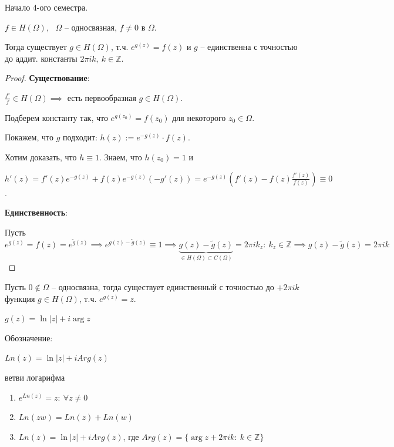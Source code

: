 Начало 4-ого семестра.

\begin{theorem}
    $f \in H(\Omega)$, \ $\Omega$ -- односвязная, $f \not = 0$ в $\Omega$.

    Тогда существует $g \in H(\Omega)$, т.ч. $e^{g(z)} = f(z)$ и $g$ -- единственна с точностью до аддит. константы $2 \pi i k, \ k \in \mathbb{Z}$.
\end{theorem}

\begin{proof}
    \textbf{Существование}:

    $\frac{f'}{f} \in H(\Omega) \implies $ есть первообразная $g \in H(\Omega)$. 
    
    Подберем константу так, что $e^{g(z_0)} =  f(z_0)$ для некоторого $z_0 \in \Omega$. 

    Покажем, что $g$ подходит: $h(z) := e^{-g(z)} \cdot f(z)$.

    Хотим доказать, что $h \equiv 1$. Знаем, что $h(z_0) = 1$ и
    
    $h'(z) = f'(z) e^{-g(z)} + f(z) e^{-g(z)} (-g'(z)) = e^{-g(z)} \left( f'(z) - f(z) \frac{f'(z)}{f(z)} \right) \equiv 0$.

    \textbf{Единственность}:

    Пусть $e^{g(z)} = f(z) = e^{\tilde{g}(z)} \implies e^{g(z) - \tilde{g}(z)} \equiv 1 \implies \underbrace{g(z) - \tilde{g}(z)}_{\in H(\Omega) \subset C(\Omega)} = 2 \pi i k_{z}: \ k_{z} \in \mathbb{Z} \implies g(z) - \tilde{g}(z) = 2 \pi i k$
\end{proof}

\begin{consequence}
    Пусть $0 \not \in \Omega$ -- односвязна, тогда существует единственный с точностью до $+ 2 \pi i k$ функция $g \in H(\Omega)$, т.ч. $e^{g(z)} = z$.
\end{consequence}

\begin{remark}
    $g(z) = \ln{|z|} + i \arg{z}$
\end{remark}

\begin{remark}
    Обозначение:

    $Ln(z) = \ln{|z|} + i Arg(z)$


    ветви логарифма
\end{remark}


\begin{properties}
    \begin{enumerate}
        \item $e^{Ln(z)} = z: \ \forall z \not = 0$
        \item $Ln(z w) = Ln(z) + Ln(w)$
        \item $Ln(z) = \ln{|z|} + i Arg(z)$, где $Arg(z) = \{ \arg{z} + 2 \pi i k: \ k \in \mathbb{Z} \}$
    \end{enumerate}
\end{properties}


